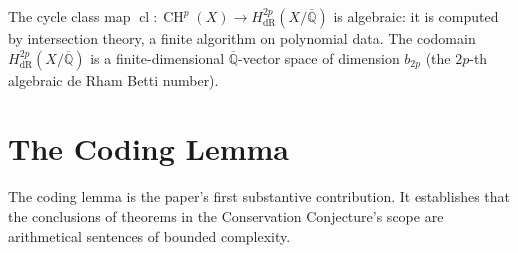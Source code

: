 \documentclass[11pt,a4paper]{article}
\theoremstyle{plain}
\theoremstyle{definition}
\newcommand{\Q}{\mathbb{Q}}
\DeclareMathOperator{\cl}{cl}
\DeclareMathOperator{\CH}{CH}
\begin{document}
The cycle class map $\cl : \CH^p(X) \to H^{2p}_{\mathrm{dR}}(X/\overline{\Q})$ is algebraic: it is computed by intersection theory, a finite algorithm on polynomial data.  The codomain $H^{2p}_{\mathrm{dR}}(X/\overline{\Q})$ is a finite-dimensional $\overline{\Q}$-vector space of dimension $b_{2p}$ (the $2p$-th algebraic de Rham Betti number).


\section{The Coding Lemma}\label{sec:coding}

The coding lemma is the paper's first substantive contribution.  It establishes that the conclusions of theorems in the Conservation Conjecture's scope are arithmetical sentences of bounded complexity.
\end{document}
